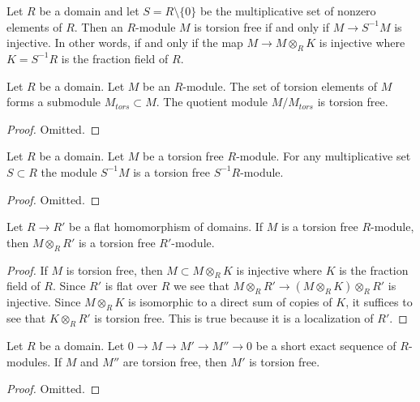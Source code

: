 \noindent
Let $R$ be a domain and let $S = R \setminus \{0\}$ be the multiplicative
set of nonzero elements of $R$. Then an $R$-module $M$ is torsion free if
and only if $M \to S^{-1}M$ is injective. In other words, if and only if
the map $M \to M \otimes_R K$ is injective where $K = S^{-1}R$ is the fraction
field of $R$.

\begin{lemma}
\label{lemma-torsion}
Let $R$ be a domain. Let $M$ be an $R$-module.
The set of torsion elements of $M$ forms a submodule $M_{tors} \subset M$.
The quotient module $M/M_{tors}$ is torsion free.
\end{lemma}

\begin{proof}
Omitted.
\end{proof}

\begin{lemma}
\label{lemma-localize-torsion}
Let $R$ be a domain. Let $M$ be a torsion free $R$-module.
For any multiplicative set $S \subset R$ the module
$S^{-1}M$ is a torsion free $S^{-1}R$-module.
\end{lemma}

\begin{proof}
Omitted.
\end{proof}

\begin{lemma}
\label{lemma-flat-pullback-torsion}
Let $R \to R'$ be a flat homomorphism of domains. If $M$ is a torsion
free $R$-module, then $M \otimes_R R'$ is a torsion free $R'$-module.
\end{lemma}

\begin{proof}
If $M$ is torsion free, then $M \subset M \otimes_R K$ is injective
where $K$ is the fraction field of $R$. Since $R'$ is flat over $R$
we see that $M \otimes_R R' \to (M \otimes_R K) \otimes_R R'$ is injective.
Since $M \otimes_R K$ is isomorphic to a direct sum of copies of $K$,
it suffices to see that $K \otimes_R R'$ is torsion free. This is true
because it is a localization of $R'$.
\end{proof}

\begin{lemma}
\label{lemma-extension-torsion-free}
Let $R$ be a domain. Let $0 \to M \to M' \to M'' \to 0$
be a short exact sequence of $R$-modules. If $M$ and $M''$
are torsion free, then $M'$ is torsion free.
\end{lemma}

\begin{proof}
Omitted.
\end{proof}

